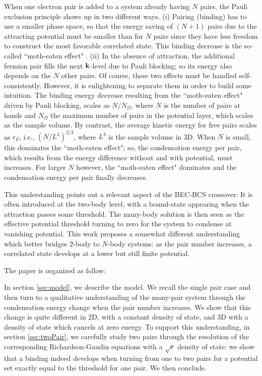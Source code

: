 \documentclass[5p,twocolumn]{elsarticle}
\begin{document}
When one electron pair is added to a system already having $N$ pairs, the Pauli exclusion principle shows up in two different ways.  (i) Pairing (binding) has to use a smaller phase space, so that the energy saving of $(N+1)$ pairs due to the attracting potential must be smaller than for $N$ pairs since they have less freedom to construct the most favorable correlated state.   This binding decrease is the so-called ``moth-eaten effect" \cite{moth}. (ii) In the absence of attraction, the additional fermion pair fills the next $\mathbf{k}$-level due to Pauli blocking; so its energy also depends on the $N$ other pairs.  Of course, these two effects must be handled self-consistently. However, it is enlightening to separate them in order to build some intuition. The binding energy decrease resulting from the ``moth-eaten effect" driven by Pauli blocking, scales as $N/N_\Omega$, where $N$ is the number of pairs at hands and $N_\Omega$ the maximum number of pairs in the potential layer, which scales as the sample volume. By contrast, the average kinetic energy for free pairs scales as $\epsilon_F$, i.e., $(N/L^3)^{2/3}$, where $L^{3}$ is the sample volume in 3D. 
When $N$ is small, this dominates the ``moth-eaten effect"; so, the condensation energy per pair, which results from the energy difference without and with potential, must increases.  For larger $N$ however, the ``moth-eaten effect" dominates and the condensation energy per pair finally decreases.

This understanding points out a relevant aspect of the BEC-BCS crossover:  It is often introduced at the two-body level, with a bound-state appearing when the attraction passes some threshold. The many-body solution is then seen as the effective potential threshold turning to zero for the system to condense at vanishing potential. This work proposes a somewhat different understanding which better bridges $2$-body to $N$-body systems: as the pair number increases, a correlated state develops at a lower but still finite potential.

The paper is organized as follow:

In section \ref{sec:model}, we describe the model. We recall the single pair case and then turn to a qualitative understanding of the many-pair system through the condensation energy change when the pair number increases. We show that this change is quite different in 2D, with a constant density of state, and 3D  with a density of state which cancels at zero energy.  To support this understanding, in section \ref{sec:twoPair}, we carefully study two pairs through the resolution of the corresponding  Richardson-Gaudin equations with a $\sqrt{\epsilon}$ density of state: we show that  a binding indeed develops when turning from one to two pairs for a potential set exactly equal to the threshold for one pair. We then conclude.
\end{document}
